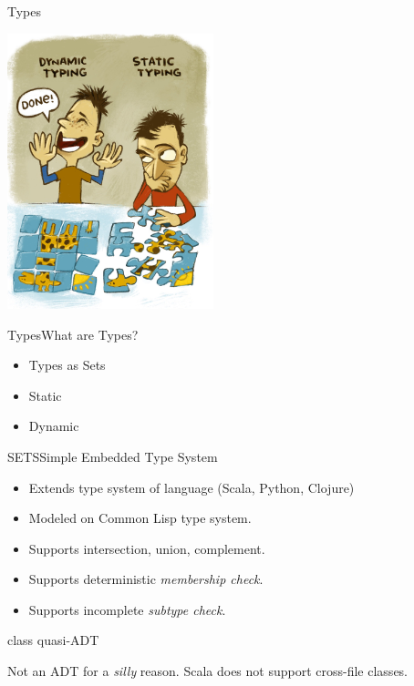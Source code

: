 
\begin{frame}{Types}
  \centering
  
    \includegraphics[height=8cm]{typing.png}
\end{frame}

\begin{frame}{Types}{What are Types?}
  \begin{itemize}
  \item Types as Sets
  \item Static
  \item Dynamic
  \end{itemize}
\end{frame}

\begin{frame}{SETS}{Simple Embedded Type System}

  \scalebox{1.0}{}

  \begin{itemize}
  \item   Extends type system of language (Scala, Python, Clojure)
  \item   Modeled on Common Lisp type system.
  \item   Supports intersection, union, complement.
  \item   Supports deterministic \emph{membership check}.
  \item   Supports incomplete \emph{subtype check}.
  \end{itemize}
\end{frame}

\begin{frame}{ class quasi-ADT}
  \scalebox{0.8}{}

  \medskip

  Not an ADT for a \emph{silly} reason.  Scala does not support cross-file  classes.

\end{frame}


